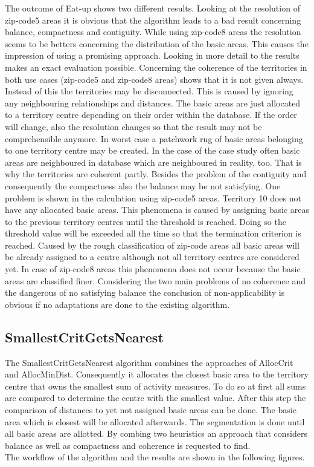The outcome of Eat-up shows two different results. Looking at the resolution of zip-code5 areas it is obvious that the algorithm leads to a bad result concerning balance, compactness and contiguity. While using zip-code8 areas the resolution seems to be betters concerning the distribution of the basic areas. This causes the impression of using a promising approach. Looking in more detail to the results makes an exact evaluation possible. Concerning the coherence of the territories in both use cases (zip-code5 and zip-code8 areas) shows that it is not given always. Instead of this the territories may be disconnected. This is caused by ignoring any neighbouring relationships and distances. The basic areas are just allocated to a territory centre depending on their order within the database. If the order will change, also the resolution changes so that the result may not be comprehensible anymore. In worst case a patchwork rug of basic areas belonging to one territory centre may be created. In the case of the case study often basic areas are neighboured in database which are neighboured in reality, too. That is why the territories are coherent partly. Besides the problem of the contiguity and consequently the compactness also the balance may be not satisfying. One problem is shown in the calculation using zip-code5 areas. Territory 10 does not have any allocated basic areas. This phenomena is caused by assigning basic areas to the previous territory centres until the threshold is reached. Doing so the threshold value will be exceeded all the time so that the termination criterion is reached. Caused by the rough classification of zip-code areas all basic areas will be already assigned to a centre although not all territory centres are considered yet. In case of zip-code8 areas this phenomena does not occur because the basic areas are classified finer. Considering the two main problems of no coherence and the dangerous of no satisfying balance the conclusion of non-applicability is obvious if no adaptations are done to the existing algorithm.
 

\subsection{SmallestCritGetsNearest}

The SmallestCritGetsNearest algorithm combines the approaches of AllocCrit and AllocMinDist. Consequently it allocates the closest basic area to the territory centre that owns the smallest sum of activity measures. To do so at first all sums are compared to determine the centre with the smallest value. After this step the comparison of distances to yet not assigned basic areas can be done. The basic area which is closest will be allocated afterwards. The segmentation is done until all basic areas are allotted. By combing two heuristics an approach that considers balance as well as compactness and coherence is requested to find.\\
The workflow of the algorithm and the results are shown in the following figures.



